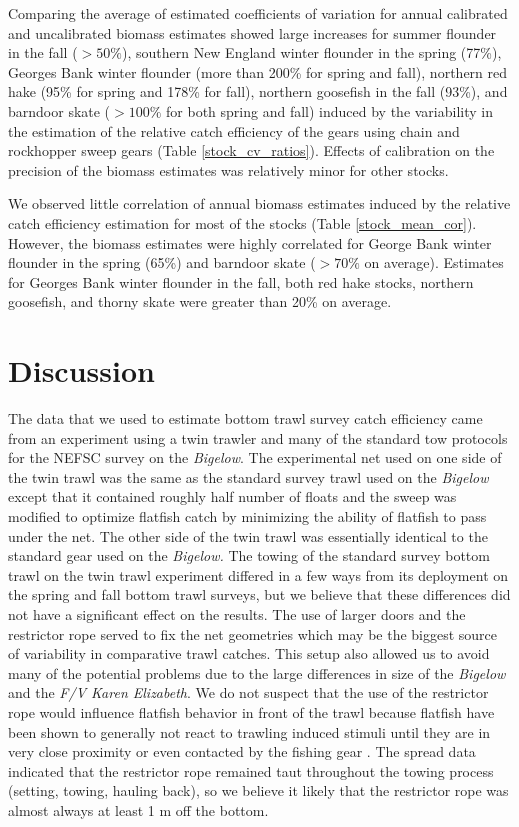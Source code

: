 \documentclass[
  12pt,
]{article}
\begin{document}
Comparing the average of estimated coefficients of variation for annual
calibrated and uncalibrated biomass estimates showed large increases for
summer flounder in the fall (\(> 50\%\)), southern New England winter
flounder in the spring (77\%), Georges Bank winter flounder (more than
200\% for spring and fall), northern red hake (95\% for spring and 178\%
for fall), northern goosefish in the fall (93\%), and barndoor skate
(\(>100\%\) for both spring and fall) induced by the variability in the
estimation of the relative catch efficiency of the gears using chain and
rockhopper sweep gears (Table \ref{stock_cv_ratios}). Effects of
calibration on the precision of the biomass estimates was relatively
minor for other stocks.

We observed little correlation of annual biomass estimates induced by
the relative catch efficiency estimation for most of the stocks (Table
\ref{stock_mean_cor}). However, the biomass estimates were highly
correlated for George Bank winter flounder in the spring (65\%) and
barndoor skate (\(>70\%\) on average). Estimates for Georges Bank winter
flounder in the fall, both red hake stocks, northern goosefish, and
thorny skate were greater than 20\% on average.

\hypertarget{discussion}{%
\section{Discussion}\label{discussion}}

The data that we used to estimate bottom trawl survey catch efficiency
came from an experiment using a twin trawler and many of the standard
tow protocols for the NEFSC survey on the \emph{Bigelow}. The
experimental net used on one side of the twin trawl was the same as the
standard survey trawl used on the \emph{Bigelow} except that it
contained roughly half number of floats and the sweep was modified to
optimize flatfish catch by minimizing the ability of flatfish to pass
under the net. The other side of the twin trawl was essentially
identical to the standard gear used on the \emph{Bigelow.} The towing of
the standard survey bottom trawl on the twin trawl experiment differed
in a few ways from its deployment on the spring and fall bottom trawl
surveys, but we believe that these differences did not have a
significant effect on the results. The use of larger doors and the
restrictor rope served to fix the net geometries which may be the
biggest source of variability in comparative trawl catches. This setup
also allowed us to avoid many of the potential problems due to the large
differences in size of the \emph{Bigelow} and the \emph{F/V Karen
Elizabeth}. We do not suspect that the use of the restrictor rope would
influence flatfish behavior in front of the trawl because flatfish have
been shown to generally not react to trawling induced stimuli until they
are in very close proximity or even contacted by the fishing gear
\citep{ryeretal10}. The spread data indicated that the restrictor rope
remained taut throughout the towing process (setting, towing, hauling
back), so we believe it likely that the restrictor rope was almost
always at least 1 m off the bottom.
\end{document}
